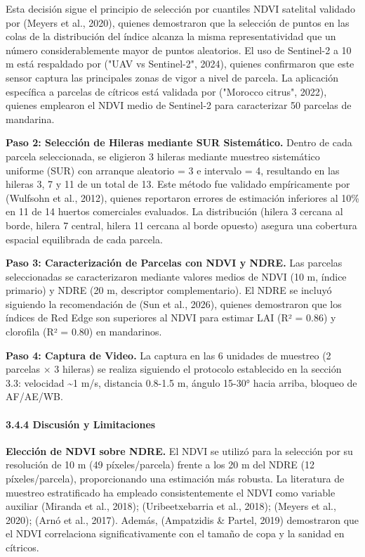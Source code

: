 Esta decisión sigue el principio de selección por cuantiles NDVI satelital validado por (Meyers et al., 2020), quienes demostraron que la selección de puntos en las colas de la distribución del índice alcanza la misma representatividad que un número considerablemente mayor de puntos aleatorios. El uso de Sentinel-2 a 10 m está respaldado por ("UAV vs Sentinel-2", 2024), quienes confirmaron que este sensor captura las principales zonas de vigor a nivel de parcela. La aplicación específica a parcelas de cítricos está validada por ("Morocco citrus", 2022), quienes emplearon el NDVI medio de Sentinel-2 para caracterizar 50 parcelas de mandarina.


\textbf{Paso 2: Selección de Hileras mediante SUR Sistemático.} Dentro de cada parcela seleccionada, se eligieron 3 hileras mediante muestreo sistemático uniforme (SUR) con arranque aleatorio = 3 e intervalo = 4, resultando en las hileras 3, 7 y 11 de un total de 13. Este método fue validado empíricamente por (Wulfsohn et al., 2012), quienes reportaron errores de estimación inferiores al 10\% en 11 de 14 huertos comerciales evaluados. La distribución (hilera 3 cercana al borde, hilera 7 central, hilera 11 cercana al borde opuesto) asegura una cobertura espacial equilibrada de cada parcela.


\textbf{Paso 3: Caracterización de Parcelas con NDVI y NDRE.} Las parcelas seleccionadas se caracterizaron mediante valores medios de NDVI (10 m, índice primario) y NDRE (20 m, descriptor complementario). El NDRE se incluyó siguiendo la recomendación de (Sun et al., 2026), quienes demostraron que los índices de Red Edge son superiores al NDVI para estimar LAI (R² = 0.86) y clorofila (R² = 0.80) en mandarinos.


\textbf{Paso 4: Captura de Video.} La captura en las 6 unidades de muestreo (2 parcelas × 3 hileras) se realiza siguiendo el protocolo establecido en la sección 3.3: velocidad \textasciitilde{}1 m/s, distancia 0.8-1.5 m, ángulo 15-30° hacia arriba, bloqueo de AF/AE/WB.


\paragraph{3.4.4 Discusión y Limitaciones}


\textbf{Elección de NDVI sobre NDRE.} El NDVI se utilizó para la selección por su resolución de 10 m (49 píxeles/parcela) frente a los 20 m del NDRE (12 píxeles/parcela), proporcionando una estimación más robusta. La literatura de muestreo estratificado ha empleado consistentemente el NDVI como variable auxiliar (Miranda et al., 2018); (Uribeetxebarria et al., 2018); (Meyers et al., 2020); (Arnó et al., 2017). Además, (Ampatzidis \& Partel, 2019) demostraron que el NDVI correlaciona significativamente con el tamaño de copa y la sanidad en cítricos.


